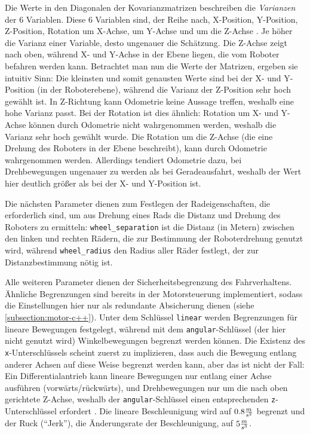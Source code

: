 \documentclass[german]{thesis_KBS}
\newcommand{\code}[1]{\texttt{#1}}  %
\begin{document}
Die Werte in den Diagonalen der Kovarianzmatrizen beschreiben die
\emph{Varianzen} der 6 Variablen. Diese 6 Variablen sind, der Reihe nach,
X-Position, Y-Position, Z-Position, Rotation um X-Achse, um Y-Achse und um die
Z-Achse \cite{ros-pose-with-covariance} \cite{ros-twist-with-covariance}. Je
höher die Varianz einer Variable, desto ungenauer die Schätzung. Die Z-Achse
zeigt nach oben, während X- und Y-Achse in der Ebene liegen, die vom Roboter
befahren werden kann. Betrachtet man nun die Werte der Matrizen, ergeben sie
intuitiv Sinn: Die kleinsten und somit genausten Werte sind bei der X- und
Y-Position (in der Roboterebene), während die Varianz der Z-Position sehr hoch
gewählt ist. In Z-Richtung kann Odometrie keine Aussage treffen, weshalb eine
hohe Varianz passt. Bei der Rotation ist dies ähnlich: Rotation um X- und
Y-Achse können durch Odometrie nicht wahrgenommen werden, weshalb die Varianz
sehr hoch gewählt wurde. Die Rotation um die Z-Achse (die eine Drehung des
Roboters in der Ebene beschreibt), kann durch Odometrie wahrgenommen werden.
Allerdings tendiert Odometrie dazu, bei Drehbewegungen ungenauer zu werden als
bei Geradeausfahrt, weshalb der Wert hier deutlich größer als bei der X- und
Y-Position ist.

Die nächsten Parameter dienen zum Festlegen der Radeigenschaften, die
erforderlich sind, um aus Drehung eines Rads die Distanz und Drehung des
Roboters zu ermitteln: \code{wheel\_separation} ist die Distanz (in Metern)
zwischen den linken und rechten Rädern, die zur Bestimmung der Roboterdrehung
genutzt wird, während \code{wheel\_radius} den Radius aller Räder festlegt, der
zur Distanzbestimmung nötig ist.

Alle weiteren Parameter dienen der Sicherheitsbegrenzung des Fahrverhaltens.
Ähnliche Begrenzungen sind bereits in der Motorsteuerung implementiert, sodass
die Einstellungen hier nur als redundante Absicherung dienen (siehe
\autoref{subsection:motor-c++}). Unter dem Schlüssel \code{linear} werden
Begrenzungen für lineare Bewegungen festgelegt, während mit dem
\code{angular}-Schlüssel (der hier nicht genutzt wird) Winkelbewegungen begrenzt
werden können. Die Existenz des \code{x}-Unterschlüssels scheint zuerst zu
implizieren, dass auch die Bewegung entlang anderer Achsen auf diese Weise
begrenzt werden kann, aber das ist nicht der Fall: Ein Differentialantrieb kann
lineare Bewegungen nur entlang einer Achse ausführen (vorwärts/rückwärts), und
Drehbewegungen nur um die nach oben gerichtete Z-Achse, weshalb der
\code{angular}-Schlüssel einen entsprechenden \code{z}-Unterschlüssel erfordert
\cite{ros-diff-drive-controller}. Die lineare Beschleunigung wird auf $0.8 {m
\over s^2}$ begrenzt und der Ruck ("`Jerk"'), die Änderungsrate der
Beschleunigung, auf $5 {m \over s^3}$.
\end{document}
